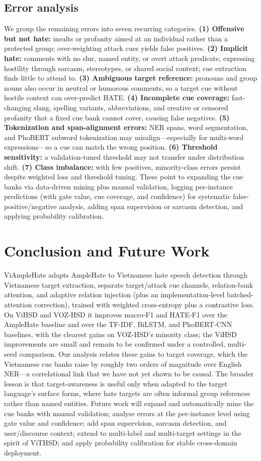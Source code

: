 \documentclass[11pt]{article}
\begin{document}
\subsection{Error analysis}
We group the remaining errors into seven recurring categories. \textbf{(1) Offensive but not hate:} insults or profanity aimed at an individual rather than a protected group; over-weighting attack cues yields false positives. \textbf{(2) Implicit hate:} comments with no slur, named entity, or overt attack predicate, expressing hostility through sarcasm, stereotypes, or shared social context; cue extraction finds little to attend to. \textbf{(3) Ambiguous target reference:} pronouns and group nouns also occur in neutral or humorous comments, so a target cue without hostile context can over-predict HATE. \textbf{(4) Incomplete cue coverage:} fast-changing slang, spelling variants, abbreviations, and creative or censored profanity that a fixed cue bank cannot cover, causing false negatives. \textbf{(5) Tokenization and span-alignment errors:} NER spans, word segmentation, and PhoBERT subword tokenization may misalign---especially for multi-word expressions---so a cue can match the wrong position. \textbf{(6) Threshold sensitivity:} a validation-tuned threshold may not transfer under distribution shift. \textbf{(7) Class imbalance:} with few positives, minority-class errors persist despite weighted loss and threshold tuning. These point to expanding the cue banks via data-driven mining plus manual validation, logging per-instance predictions (with gate value, cue coverage, and confidence) for systematic false-positive/negative analysis, adding span supervision or sarcasm detection, and applying probability calibration.

\section{Conclusion and Future Work}
ViAmpleHate adapts AmpleHate to Vietnamese hate speech detection through Vietnamese target extraction, separate target/attack cue channels, relation-bank attention, and adaptive relation injection (plus an implementation-level batched-attention correction), trained with weighted cross-entropy plus a contrastive loss. On ViHSD and VOZ-HSD it improves macro-F1 and HATE-F1 over the AmpleHate baseline and over the TF-IDF, BiLSTM, and PhoBERT-CNN baselines, with the clearest gains on VOZ-HSD's minority class; the ViHSD improvements are small and remain to be confirmed under a controlled, multi-seed comparison. Our analysis relates these gains to target coverage, which the Vietnamese cue banks raise by roughly two orders of magnitude over English NER---a correlational link that we have not yet shown to be causal. The broader lesson is that target-awareness is useful only when adapted to the target language's surface forms, where hate targets are often informal group references rather than named entities. Future work will expand and automatically mine the cue banks with manual validation; analyse errors at the per-instance level using gate value and confidence; add span supervision, sarcasm detection, and user/discourse context; extend to multi-label and multi-target settings in the spirit of ViTHSD; and apply probability calibration for stable cross-domain deployment.
\end{document}
